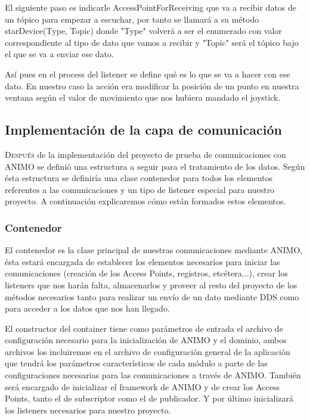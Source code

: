 \documentclass[12pt,a4paper,spanish]{book} %
\begin{document}
El siguiente paso es indicarle AccessPointForReceiving que va a recibir datos de un tópico para empezar a escuchar, por tanto se llamará a su método starDevice(Type, Topic) donde "Type" volverá a ser el enumerado con valor correspondiente al tipo de dato que vamos a recibir y "Topic" será el tópico bajo el que se va a enviar ese dato.

Así pues en el process del listener se define qué es lo que se va a hacer con ese dato. En nuestro caso la acción era modificar la posición de un punto en nuestra ventana según el valor de movimiento que nos hubiera mandado el joystick.

\subsection{Implementación de la capa de comunicación}

\lettrine{D}{espués} de la implementación del proyecto de prueba de comunicaciones con ANIMO se definió una estructura a seguir para el tratamiento de los datos. Según ésta estructura se definiría una clase contenedor para todos los elementos referentes a las comunicaciones y un tipo de listener especial para nuestro proyecto. A continuación explicaremos cómo están formados estos elementos.

\subsubsection{Contenedor}

El contenedor es la clase principal de nuestras comunicaciones mediante ANIMO, ésta estará encargada de establecer los elementos necesarios para iniciar las comunicaciones (creación de los Access Points, registros, etcétera...), crear los listeners que nos harán falta, almacenarlos y proveer al resto del proyecto de los métodos necesarios tanto para realizar un envío de un dato mediante DDS como para acceder a los datos que nos han llegado.

El constructor del container tiene como parámetros de entrada el archivo de configuración necesario para la inicialización de ANIMO y el dominio, ambos archivos los incluiremos en el archivo de configuración general de la aplicación que tendrá los parámetros característicos de cada módulo a parte de las configuraciones necesarias para las comunicaciones a través de ANIMO. También será encargado de inicializar el framework de ANIMO y de crear los Access Points, tanto el de subscriptor como el de publicador. Y por último inicializará los listeners necesarios para nuestro proyecto.
\end{document}
